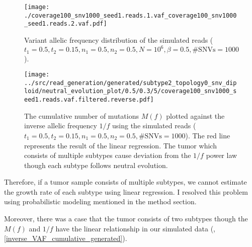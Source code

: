 \documentclass{article}
\begin{document}
\begin{figure}[H]
 \begin{minipage}[c]{0.47\hsize}
 \begin{center}
  \texttt{[image: ./coverage100\_snv1000\_seed1.reads.1.vaf\_coverage100\_snv1000\_seed1.reads.2.vaf.pdf]}
 \end{center}
    \caption{
  Variant allelic frequency distribution of the simulated reads ($t_1 = 0.5, t_2=0.15, n_1=0.5, n_2=0.5, N=10^6, \beta=0.5, \text{\#SNVs}=1000$).
  }\label{simulated_vaf}
\end{minipage}
 \hspace{1truecm}
\begin{minipage}[c]{0.47\hsize}
 \begin{center}
  \texttt{[image: ../src/read\_generation/generated/subtype2\_topology0\_snv\_diploid/neutral\_evolution\_plot/0.5/0.3/5/coverage100\_snv1000\_seed1.reads.vaf.filtered.reverse.pdf]}
 \end{center}
   \caption{
  The cumulative number of mutations $M(f)$ plotted against the inverse allelic frequency $1/f$
  using the simulated reads ($t_1 = 0.5, t_2=0.15, n_1=0.5, n_2=0.5, \text{\#SNVs}=1000$).
  The red line represents the result of the linear regression.
 The tumor which consists of multiple subtypes cause deviation from the $1/f$ power law though each subtype follows neutral evolution.
  }
 \label{simulated_linear_regression}
\end{minipage}
\end{figure}

Therefore, if a tumor sample consists of multiple subtypes, we cannot estimate the growth rate of each subtype using linear regression.
I resolved this problem using probabilistic modeling mentioned in the method section.

Moreover, there was a case that the tumor consists of two subtypes though the $M(f)$ and $1/f$ have the linear relationship in our simulated data (, \ref{inverse_VAF_cumulative_generated}).
\end{document}
